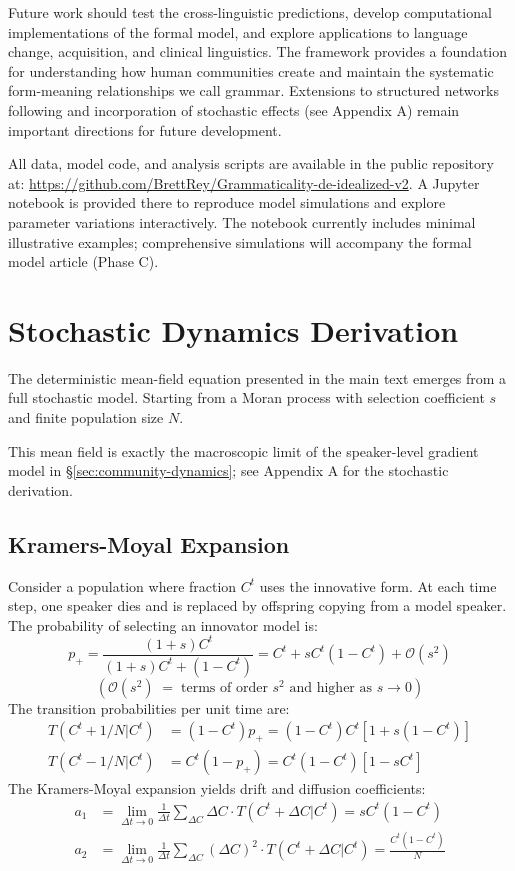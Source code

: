 \documentclass[12pt]{article}
\begin{document}
Future work should test the cross-linguistic predictions, develop computational implementations of the formal model, and explore applications to language change, acquisition, and clinical linguistics. The framework provides a foundation for understanding how human communities create and maintain the systematic form-meaning relationships we call grammar. Extensions to structured networks following \textcite{baxter2006} and incorporation of stochastic effects (see Appendix A) remain important directions for future development.

\begin{tcolorbox}[colback=lsLightBlue!20,title=Data and code availability]
All data, model code, and analysis scripts are available in the public repository at: 
\url{https://github.com/BrettRey/Grammaticality-de-idealized-v2}.
A Jupyter notebook is provided there to reproduce model simulations and explore parameter variations interactively. The notebook currently includes minimal illustrative examples; comprehensive simulations will accompany the formal model article (Phase C).
\end{tcolorbox}


\newpage
\appendix

\section{Stochastic Dynamics Derivation}

The deterministic mean-field equation presented in the main text emerges from a full stochastic model. Starting from a Moran process with selection coefficient $s$ and finite population size $N$.

This mean field is exactly the macroscopic limit of the speaker-level gradient model in §\ref{sec:community-dynamics}; see Appendix A for the stochastic derivation.


\subsection{Kramers-Moyal Expansion}

Consider a population where fraction $C^t$ uses the innovative form. At each time step, one speaker dies and is replaced by offspring copying from a model speaker. The probability of selecting an innovator model is:
$$p_+ = \frac{(1+s)C^t}{(1+s)C^t + (1-C^t)} = C^t + sC^t(1-C^t) + \mathcal{O}(s^2)$$
\[
  (\mathcal{O}(s^{2}) \;=\; \text{terms of order } s^{2} \text{ and higher as } s \to 0)
\]
The transition probabilities per unit time are:
\begin{align}
T(C^t + 1/N | C^t) &= (1-C^t)p_+ = (1-C^t)C^t[1 + s(1-C^t)]\\
T(C^t - 1/N | C^t) &= C^t(1-p_+) = C^t(1-C^t)[1 - sC^t]
\end{align}
The Kramers-Moyal expansion yields drift and diffusion coefficients:
\begin{align}
a_1 &= \lim_{\Delta t \to 0} \frac{1}{\Delta t}\sum_{\Delta C} \Delta C \cdot T(C^t + \Delta C | C^t) = sC^t(1-C^t)\\
a_2 &= \lim_{\Delta t \to 0} \frac{1}{\Delta t}\sum_{\Delta C} (\Delta C)^2 \cdot T(C^t + \Delta C | C^t) = \frac{C^t(1-C^t)}{N}
\end{align}
\end{document}
